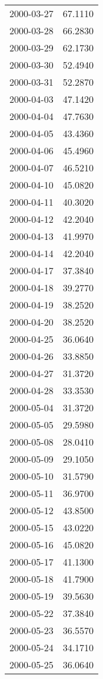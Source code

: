 \begin{tabular}{lr}
2000-03-27 &     67.1110 \\
2000-03-28 &     66.2830 \\
2000-03-29 &     62.1730 \\
2000-03-30 &     52.4940 \\
2000-03-31 &     52.2870 \\
2000-04-03 &     47.1420 \\
2000-04-04 &     47.7630 \\
2000-04-05 &     43.4360 \\
2000-04-06 &     45.4960 \\
2000-04-07 &     46.5210 \\
2000-04-10 &     45.0820 \\
2000-04-11 &     40.3020 \\
2000-04-12 &     42.2040 \\
2000-04-13 &     41.9970 \\
2000-04-14 &     42.2040 \\
2000-04-17 &     37.3840 \\
2000-04-18 &     39.2770 \\
2000-04-19 &     38.2520 \\
2000-04-20 &     38.2520 \\
2000-04-25 &     36.0640 \\
2000-04-26 &     33.8850 \\
2000-04-27 &     31.3720 \\
2000-04-28 &     33.3530 \\
2000-05-04 &     31.3720 \\
2000-05-05 &     29.5980 \\
2000-05-08 &     28.0410 \\
2000-05-09 &     29.1050 \\
2000-05-10 &     31.5790 \\
2000-05-11 &     36.9700 \\
2000-05-12 &     43.8500 \\
2000-05-15 &     43.0220 \\
2000-05-16 &     45.0820 \\
2000-05-17 &     41.1300 \\
2000-05-18 &     41.7900 \\
2000-05-19 &     39.5630 \\
2000-05-22 &     37.3840 \\
2000-05-23 &     36.5570 \\
2000-05-24 &     34.1710 \\
2000-05-25 &     36.0640 \\

\end{tabular}
